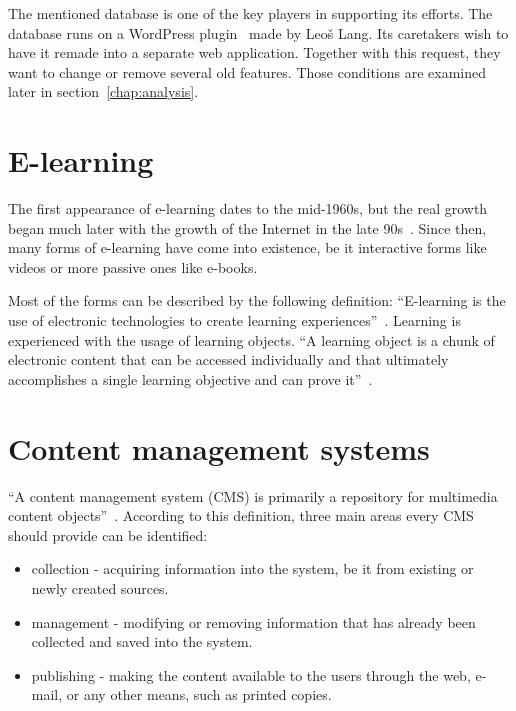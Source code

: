 \documentclass[
  digital,     %
  oneside,     %
  nosansbold,  %
  colorbold, %
  lof,         %
  lot,         %
]{fithesis4}
\begin{document}
The mentioned database is one of the key players in supporting its efforts.
The database runs on a WordPress plugin~\cite{lang18} made by Leoš Lang.
Its caretakers wish to have it remade into a separate web application. Together
with this request, they want to change or remove several old features. Those
conditions are examined later in section~\ref{chap:analysis}.

\section{E-learning}

The first appearance of \mbox{e-learning} dates to the \mbox{mid-1960s}, but
the real growth began much later with the growth of the Internet in the late
90s~\cite{research_e-learning}. Since then, many forms of \mbox{e-learning}
have come into existence, be it interactive forms like videos or more passive
ones like \mbox{e-books}.

Most of the forms can be described by the following definition:  “E-learning is the use
of electronic technologies to create learning experiences”~\parencite[page.~1]{horton11}.
Learning is experienced with the usage of learning objects. “A learning object is a chunk
of electronic content that can be accessed individually and that ultimately accomplishes
a single learning objective and can prove it”~\parencite[page.~47]{horton11}.

\section{Content management systems}

“A content management system (CMS) is primarily a repository for multimedia content
objects”~\parencite[page.~17]{mauthe04}. According to this definition, three main
areas every CMS should provide can be identified:

\begin{itemize}
    \item collection - acquiring information into the system, be it from existing
    or newly created sources.
    \item management - modifying or removing information that has already been
    collected and saved into the system.
    \item publishing - making the content available to the users through the web,
    e-mail, or any other means, such as printed copies.
\end{itemize}
\end{document}
